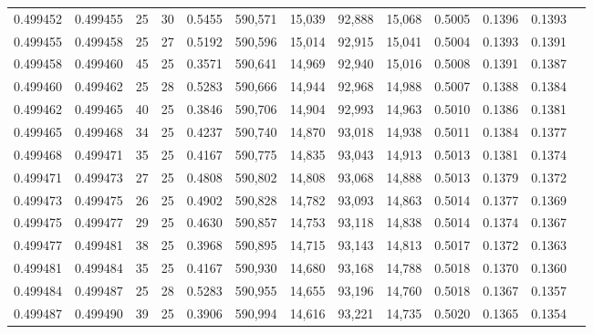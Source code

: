 \begin{tabular}{rrrrrrrrrrrrr}
0.499452 & 0.499455 &    25 &  30 &                                     0.5455 & 590,571 &  15,039 &  92,888 &  15,068 & 0.5005 & 0.1396 & 0.1393 \\
0.499455 & 0.499458 &    25 &  27 &                                     0.5192 & 590,596 &  15,014 &  92,915 &  15,041 & 0.5004 & 0.1393 & 0.1391 \\
0.499458 & 0.499460 &    45 &  25 &                                     0.3571 & 590,641 &  14,969 &  92,940 &  15,016 & 0.5008 & 0.1391 & 0.1387 \\
0.499460 & 0.499462 &    25 &  28 &                                     0.5283 & 590,666 &  14,944 &  92,968 &  14,988 & 0.5007 & 0.1388 & 0.1384 \\
0.499462 & 0.499465 &    40 &  25 &                                     0.3846 & 590,706 &  14,904 &  92,993 &  14,963 & 0.5010 & 0.1386 & 0.1381 \\
0.499465 & 0.499468 &    34 &  25 &                                     0.4237 & 590,740 &  14,870 &  93,018 &  14,938 & 0.5011 & 0.1384 & 0.1377 \\
0.499468 & 0.499471 &    35 &  25 &                                     0.4167 & 590,775 &  14,835 &  93,043 &  14,913 & 0.5013 & 0.1381 & 0.1374 \\
0.499471 & 0.499473 &    27 &  25 &                                     0.4808 & 590,802 &  14,808 &  93,068 &  14,888 & 0.5013 & 0.1379 & 0.1372 \\
0.499473 & 0.499475 &    26 &  25 &                                     0.4902 & 590,828 &  14,782 &  93,093 &  14,863 & 0.5014 & 0.1377 & 0.1369 \\
0.499475 & 0.499477 &    29 &  25 &                                     0.4630 & 590,857 &  14,753 &  93,118 &  14,838 & 0.5014 & 0.1374 & 0.1367 \\
0.499477 & 0.499481 &    38 &  25 &                                     0.3968 & 590,895 &  14,715 &  93,143 &  14,813 & 0.5017 & 0.1372 & 0.1363 \\
0.499481 & 0.499484 &    35 &  25 &                                     0.4167 & 590,930 &  14,680 &  93,168 &  14,788 & 0.5018 & 0.1370 & 0.1360 \\
0.499484 & 0.499487 &    25 &  28 &                                     0.5283 & 590,955 &  14,655 &  93,196 &  14,760 & 0.5018 & 0.1367 & 0.1357 \\
0.499487 & 0.499490 &    39 &  25 &                                     0.3906 & 590,994 &  14,616 &  93,221 &  14,735 & 0.5020 & 0.1365 & 0.1354 \\

\end{tabular}
